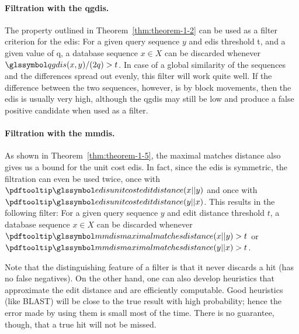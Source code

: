 \paragraph{Filtration with the \gls{qgdis}.} The property outlined in Theorem~\ref{thm:theorem-1-2} can be used
as a filter criterion for the \gls{edis}: For a given query sequence $y$ and \gls{edis}
threshold t, and a given value of q, a database sequence $x \in X$ can be discarded whenever
$\dqu (x, y)/(2q) > t$.
In case of a global similarity of the sequences and the differences spread
out evenly, this filter will work quite well.
If the difference between the two sequences,
however, is by block movements, then the \gls{edis} is usually very high, although the
\gls{qgdis} may still be low and produce a false positive candidate when used as a
filter.


\paragraph{Filtration with the \gls{mmdis}.} As shown in Theorem~\ref{thm:theorem-1-5}, the maximal
matches distance also gives us a bound for the unit cost \gls{edis}.
In fact, since the
\gls{edis} is symmetric, the filtration can even be used twice, once with $\edis(x||y)$ and
once with $\edis(y||x)$.
This results in the following filter: For a given query sequence $y$ and edit
distance threshold $t$, a database sequence $x \in X$ can be discarded whenever $\mmsym(x||y) >t$ or
$\mmsym(y||x) > t$.

Note that the distinguishing feature of a filter is that it never discards a hit (has no false
negatives).
On the other hand, one can also develop heuristics that approximate the edit
distance and are efficiently computable.
Good heuristics (like BLAST) will be close to the
true result with high probability; hence the error made by using them is small most of the
time. 
There is no guarantee, though, that a true hit will not be missed. \cite{seqan_skript}
